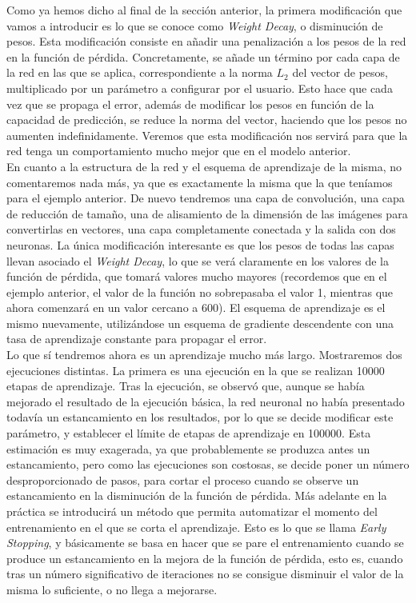 \documentclass[11pt]{article}
\theoremstyle{plain}
\theoremstyle{definition}
\begin{document}
Como ya hemos dicho al final de la sección anterior, la primera
modificación que vamos a introducir es lo que se conoce como
\textit{Weight Decay}, o disminución de pesos. Esta modificación
consiste en añadir una penalización a los pesos de la red en la
función de pérdida. Concretamente, se añade un término por cada capa
de la red en las que se aplica, correspondiente a la norma $L_2$ del
vector de pesos, multiplicado por un parámetro a configurar por el
usuario. Esto hace que cada vez que se propaga el error, además de
modificar los pesos en función de la capacidad de predicción, se
reduce la norma del vector, haciendo que los pesos no aumenten
indefinidamente. Veremos que esta modificación nos servirá para que
la red tenga un comportamiento mucho mejor que en el modelo anterior.\\

En cuanto a la estructura de la red y el esquema de aprendizaje de la
misma, no comentaremos nada más, ya que es exactamente la misma que la
que teníamos para el ejemplo anterior. De nuevo tendremos una capa de
convolución, una capa de reducción de tamaño, una de alisamiento de la
dimensión de las imágenes para convertirlas en vectores, una capa
completamente conectada y la salida con dos neuronas. La única
modificación interesante es que los pesos de todas las capas llevan
asociado el \textit{Weight Decay}, lo que se verá claramente en los
valores de la función de pérdida, que tomará valores mucho mayores
(recordemos que en el ejemplo anterior, el valor de la función no
sobrepasaba el valor 1, mientras que ahora comenzará en un valor
cercano a 600). El esquema de aprendizaje es el mismo nuevamente,
utilizándose un esquema de gradiente descendente
con una tasa de aprendizaje constante para propagar el error.\\

Lo que sí tendremos ahora es un aprendizaje mucho más largo.
Mostraremos dos ejecuciones distintas. La primera es una ejecución en
la que se realizan 10000 etapas de aprendizaje. Tras la ejecución, se
observó que, aunque se había mejorado el resultado de la ejecución
básica, la red neuronal no había presentado todavía un estancamiento
en los resultados, por lo que se decide modificar este parámetro, y
establecer el límite de etapas de aprendizaje en 100000. Esta
estimación es muy exagerada, ya que probablemente se produzca antes un
estancamiento, pero como las ejecuciones son costosas, se decide poner
un número desproporcionado de pasos, para cortar el proceso cuando se
observe un estancamiento en la disminución de la función de pérdida.
Más adelante en la práctica se introducirá un método que permita
automatizar el momento del entrenamiento en el que se corta el
aprendizaje. Esto es lo que se llama \textit{Early Stopping}, y
básicamente se basa en hacer que se pare el entrenamiento cuando
se produce un estancamiento en la mejora de la función de pérdida,
esto es, cuando tras un número significativo de iteraciones no se
consigue disminuir el valor de la misma lo suficiente, o no llega
a mejorarse.\\
\end{document}
